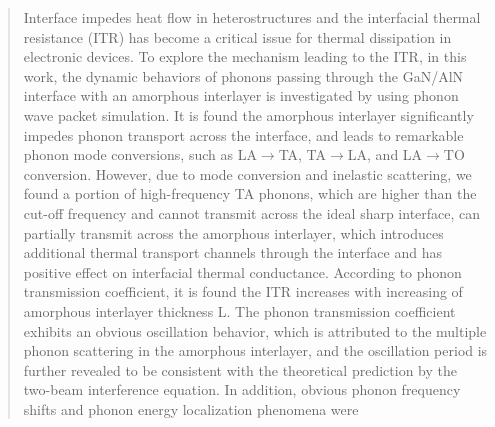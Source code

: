 \documentclass{article}
\begin{document}

\renewcommand{\shorttitle}{Phonon dynamic behaviors induced by amorphous interlayer at heterointerfaces}


\maketitle

\begin{abstract}
Interface impedes heat flow in heterostructures and the interfacial thermal resistance (ITR) has become a critical issue for thermal dissipation in electronic devices. To explore the mechanism leading to the ITR, in this work, the dynamic behaviors of phonons passing through the GaN/AlN interface with an amorphous interlayer is investigated by using phonon wave packet simulation. It is found the amorphous interlayer significantly impedes phonon transport across the interface, and leads to remarkable phonon mode conversions, such as LA$\rightarrow$TA, TA$\rightarrow$LA, and LA$\rightarrow$TO conversion. However, due to mode conversion and inelastic scattering, we found a portion of high-frequency TA phonons, which are higher than the cut-off frequency and cannot transmit across the ideal sharp interface, can partially transmit across the amorphous interlayer, which introduces additional thermal transport channels through the interface and has positive effect on interfacial thermal conductance. According to phonon transmission coefficient, it is found the ITR increases with increasing of amorphous interlayer thickness L. The phonon transmission coefficient exhibits an obvious oscillation behavior, which is attributed to the multiple phonon scattering in the amorphous interlayer, and the oscillation period is further revealed to be consistent with the theoretical prediction by the two-beam interference equation. In addition, obvious phonon frequency shifts and phonon energy localization phenomena were
\end{abstract}
\end{document}

